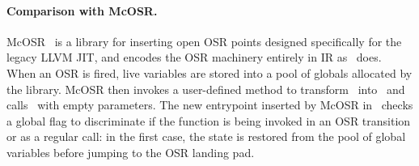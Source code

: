 \paragraph{Comparison with McOSR.}


McOSR~\cite{lameed2013modular} is a library for inserting open OSR points designed specifically for the legacy LLVM JIT, and encodes the OSR machinery entirely in IR as \osrkit\ does. When an OSR is fired, live variables are stored into a pool of globals allocated by the library. McOSR then invokes a user-defined method to transform \fbase\ into \fvariant\ and calls \fbase\ with empty parameters. The new entrypoint inserted by McOSR in \fbase\ checks a global flag to discriminate if the function is being invoked in an OSR transition or as a regular call: in the first case, the state is restored from the pool of global variables before jumping to the OSR landing pad.

